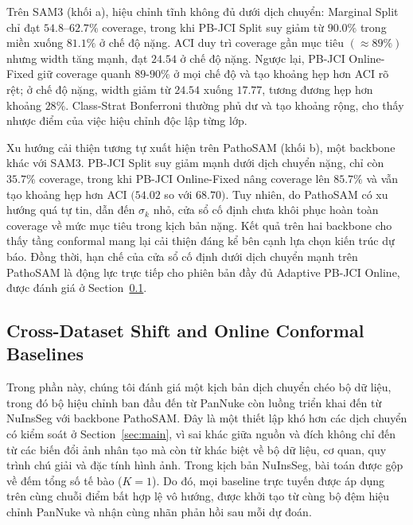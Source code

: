 \documentclass[pdflatex,sn-mathphys-num]{sn-jnl}
\begin{document}
Trên SAM3 (khối a), hiệu chỉnh tĩnh không đủ dưới dịch chuyển: Marginal Split chỉ
đạt \(54.8\)--\(62.7\%\) coverage, trong khi PB-JCI Split suy giảm từ \(90.0\%\) trong
miền xuống \(81.1\%\) ở chế độ nặng. ACI duy trì coverage gần mục tiêu
\((\approx 89\%)\) nhưng width tăng mạnh, đạt \(24.54\) ở chế độ nặng. Ngược lại,
PB-JCI Online-Fixed giữ coverage quanh \(89\)-\(90\%\) ở mọi chế độ và tạo khoảng hẹp
hơn ACI rõ rệt; ở chế độ nặng, width giảm từ \(24.54\) xuống \(17.77\), tương đương
hẹp hơn khoảng \(28\%\). Class-Strat Bonferroni thường phủ dư và tạo khoảng rộng, cho
thấy nhược điểm của việc hiệu chỉnh độc lập từng lớp.

Xu hướng cải thiện tương tự xuất hiện trên PathoSAM (khối b), một backbone khác với
SAM3. PB-JCI Split suy giảm mạnh dưới dịch chuyển nặng, chỉ còn \(35.7\%\) coverage,
trong khi PB-JCI Online-Fixed nâng coverage lên \(85.7\%\) và vẫn tạo khoảng hẹp hơn
ACI \((54.02\) so với \(68.70)\). Tuy nhiên, do PathoSAM có xu hướng quá tự tin, dẫn
đến \(\sigma_k\) nhỏ, cửa sổ cố định chưa khôi phục hoàn toàn coverage về mức mục tiêu
trong kịch bản nặng. Kết quả trên hai backbone cho thấy tầng conformal mang lại cải
thiện đáng kể bên cạnh lựa chọn kiến trúc dự báo. Đồng thời, hạn chế của cửa sổ cố
định dưới dịch chuyển mạnh trên PathoSAM là động lực trực tiếp cho phiên bản đầy đủ
Adaptive PB-JCI Online, được đánh giá ở Section~\ref{sec:cross}.

\subsection{Cross-Dataset Shift and Online Conformal Baselines}\label{sec:cross}

Trong phần này, chúng tôi đánh giá một kịch bản dịch chuyển chéo bộ dữ liệu, trong đó
bộ hiệu chỉnh ban đầu đến từ PanNuke còn luồng triển khai đến từ NuInsSeg với backbone
PathoSAM. Đây là một thiết lập khó hơn các dịch chuyển có kiểm soát ở
Section~\ref{sec:main}, vì sai khác giữa nguồn và đích không chỉ đến từ các biến đổi
ảnh nhân tạo mà còn từ khác biệt về bộ dữ liệu, cơ quan, quy trình chú giải và đặc
tính hình ảnh. Trong kịch bản NuInsSeg, bài toán được gộp về đếm tổng số tế bào
(\(K=1\)). Do đó, mọi baseline trực tuyến được áp dụng trên cùng chuỗi điểm bất hợp lệ
vô hướng, được khởi tạo từ cùng bộ đệm hiệu chỉnh PanNuke và nhận cùng nhãn phản hồi
sau mỗi dự đoán.
\end{document}
